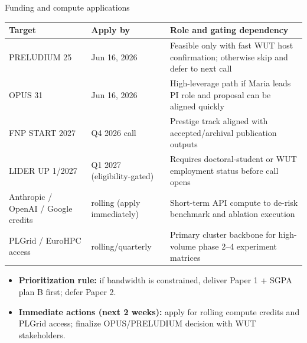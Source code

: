\documentclass[aspectratio=169]{beamer}
\begin{document}
\begin{frame}{Funding and compute applications}
  \scriptsize
  \begin{tabularx}{\textwidth}{>{\raggedright\arraybackslash}p{2.9cm} >{\raggedright\arraybackslash}p{2.0cm} >{\raggedright\arraybackslash}X}
    \toprule
    \textbf{Target} & \textbf{Apply by} & \textbf{Role and gating dependency} \\
    \midrule
    PRELUDIUM 25 & Jun 16, 2026 & Feasible only with fast WUT host confirmation; otherwise skip and defer to next call \\
    OPUS 31 & Jun 16, 2026 & High-leverage path if Maria leads PI role and proposal can be aligned quickly \\
    FNP START 2027 & Q4 2026 call & Prestige track aligned with accepted/archival publication outputs \\
    LIDER UP 1/2027 & Q1 2027 (eligibility-gated) & Requires doctoral-student or WUT employment status before call opens \\
    Anthropic / OpenAI / Google credits & rolling (apply immediately) & Short-term API compute to de-risk benchmark and ablation execution \\
    PLGrid / EuroHPC access & rolling/quarterly & Primary cluster backbone for high-volume phase 2--4 experiment matrices \\
    \bottomrule
  \end{tabularx}
  \vspace{0.25em}
  \begin{itemize}
    \item \textbf{Prioritization rule:} if bandwidth is constrained, deliver Paper 1 + SGPA plan B first; defer Paper 2.
    \item \textbf{Immediate actions (next 2 weeks):} apply for rolling compute credits and PLGrid access; finalize OPUS/PRELUDIUM decision with WUT stakeholders.
  \end{itemize}
\end{frame}
\end{document}
